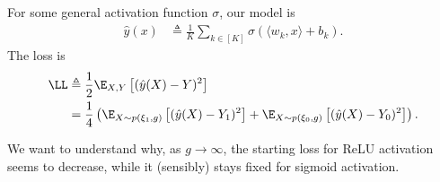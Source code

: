 \documentclass{article}
\begin{document}
For some general activation function $\sigma$, our model is
\begin{align}
  \hat{y}(x) &\triangleq \frac{1}{K} \sum_{k\in[K]} \sigma( \langle w_k, x \rangle + b_k ).
\end{align}
The loss is
\begin{align}
  \LL &\triangleq \frac{1}{2} \E_{X, Y} \left[ ( \hat{y}(X) - Y )^2 \right] \\
  &= \frac{1}{4} \left( \E_{X \sim p(\xi_1, g)} \left[ (\hat{y}(X) - Y_1)^2 \right] + \E_{X \sim p(\xi_0, g)} \left[ (\hat{y}(X) - Y_0)^2 \right] \right).
\end{align}

We want to understand why, as $g \to \infty$, the starting loss for ReLU activation seems to decrease, while it (sensibly) stays fixed for sigmoid activation.
\end{document}
